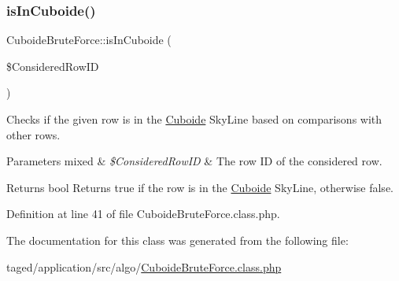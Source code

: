 \subsubsection{\texorpdfstring{is\+In\+Cuboide()}{isInCuboide()}}
{\footnotesize\ttfamily Cuboide\+Brute\+Force\+::is\+In\+Cuboide (\begin{DoxyParamCaption}\item[{}]{\$\+Considered\+Row\+ID }\end{DoxyParamCaption})\hspace{0.3cm}{\ttfamily [protected]}}

Checks if the given row is in the \hyperlink{class_cuboide}{Cuboide} Sky\+Line based on comparisons with other rows.


\begin{DoxyParams}[1]{Parameters}
mixed & {\em \$\+Considered\+Row\+ID} & The row ID of the considered row. \\
\hline
\end{DoxyParams}
\begin{DoxyReturn}{Returns}
bool Returns true if the row is in the \hyperlink{class_cuboide}{Cuboide} Sky\+Line, otherwise false. 
\end{DoxyReturn}


Definition at line 41 of file Cuboide\+Brute\+Force.\+class.\+php.



The documentation for this class was generated from the following file\+:\begin{DoxyCompactItemize}
\item 
taged/application/src/algo/\hyperlink{_cuboide_brute_force_8class_8php}{Cuboide\+Brute\+Force.\+class.\+php}\end{DoxyCompactItemize}
